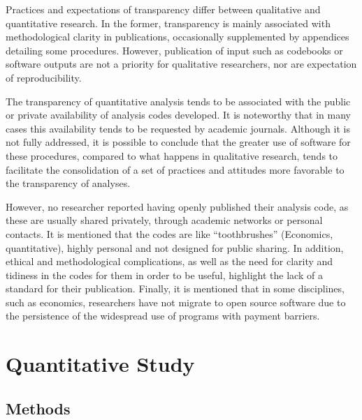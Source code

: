 \documentclass[
  letterpaper,
]{article}
\begin{document}
Practices and expectations of transparency differ between qualitative
and quantitative research. In the former, transparency is mainly
associated with methodological clarity in publications, occasionally
supplemented by appendices detailing some procedures. However,
publication of input such as codebooks or software outputs are not a
priority for qualitative researchers, nor are expectation of
reproducibility.

The transparency of quantitative analysis tends to be associated with
the public or private availability of analysis codes developed. It is
noteworthy that in many cases this availability tends to be requested by
academic journals. Although it is not fully addressed, it is possible to
conclude that the greater use of software for these procedures, compared
to what happens in qualitative research, tends to facilitate the
consolidation of a set of practices and attitudes more favorable to the
transparency of analyses.

However, no researcher reported having openly published their analysis
code, as these are usually shared privately, through academic networks
or personal contacts. It is mentioned that the codes are like
``toothbrushes'' (Economics, quantitative), highly personal and not
designed for public sharing. In addition, ethical and methodological
complications, as well as the need for clarity and tidiness in the codes
for them in order to be useful, highlight the lack of a standard for
their publication. Finally, it is mentioned that in some disciplines,
such as economics, researchers have not migrate to open source software
due to the persistence of the widespread use of programs with payment
barriers.

\section{Quantitative Study}\label{quantitative-study}

\subsection{Methods}\label{methods-1}
\end{document}
